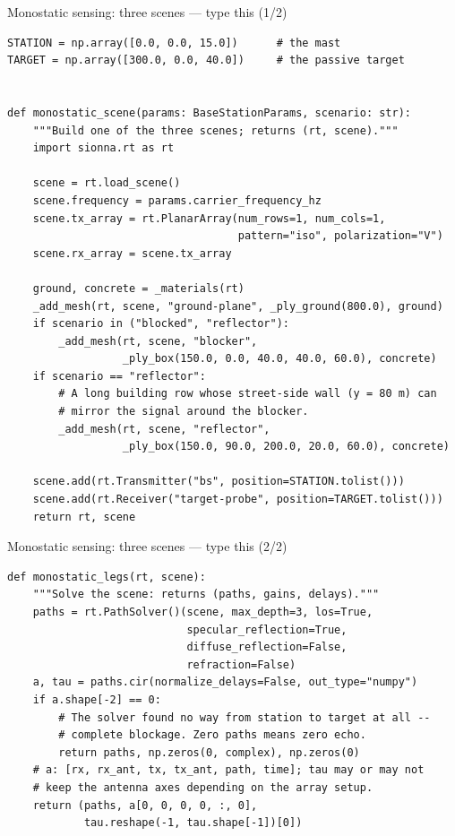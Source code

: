 \documentclass[10pt]{beamer}
\begin{document}
\begin{frame}[fragile]{Monostatic sensing: three scenes --- type this (1/2)}
\begin{lstlisting}[basicstyle=\ttfamily\tiny]
STATION = np.array([0.0, 0.0, 15.0])      # the mast
TARGET = np.array([300.0, 0.0, 40.0])     # the passive target


def monostatic_scene(params: BaseStationParams, scenario: str):
    """Build one of the three scenes; returns (rt, scene)."""
    import sionna.rt as rt

    scene = rt.load_scene()
    scene.frequency = params.carrier_frequency_hz
    scene.tx_array = rt.PlanarArray(num_rows=1, num_cols=1,
                                    pattern="iso", polarization="V")
    scene.rx_array = scene.tx_array

    ground, concrete = _materials(rt)
    _add_mesh(rt, scene, "ground-plane", _ply_ground(800.0), ground)
    if scenario in ("blocked", "reflector"):
        _add_mesh(rt, scene, "blocker",
                  _ply_box(150.0, 0.0, 40.0, 40.0, 60.0), concrete)
    if scenario == "reflector":
        # A long building row whose street-side wall (y = 80 m) can
        # mirror the signal around the blocker.
        _add_mesh(rt, scene, "reflector",
                  _ply_box(150.0, 90.0, 200.0, 20.0, 60.0), concrete)

    scene.add(rt.Transmitter("bs", position=STATION.tolist()))
    scene.add(rt.Receiver("target-probe", position=TARGET.tolist()))
    return rt, scene

\end{lstlisting}
\end{frame}

\begin{frame}[fragile]{Monostatic sensing: three scenes --- type this (2/2)}
\begin{lstlisting}[basicstyle=\ttfamily\tiny]
def monostatic_legs(rt, scene):
    """Solve the scene: returns (paths, gains, delays)."""
    paths = rt.PathSolver()(scene, max_depth=3, los=True,
                            specular_reflection=True,
                            diffuse_reflection=False,
                            refraction=False)
    a, tau = paths.cir(normalize_delays=False, out_type="numpy")
    if a.shape[-2] == 0:
        # The solver found no way from station to target at all --
        # complete blockage. Zero paths means zero echo.
        return paths, np.zeros(0, complex), np.zeros(0)
    # a: [rx, rx_ant, tx, tx_ant, path, time]; tau may or may not
    # keep the antenna axes depending on the array setup.
    return (paths, a[0, 0, 0, 0, :, 0],
            tau.reshape(-1, tau.shape[-1])[0])
\end{lstlisting}
\end{frame}
\end{document}
